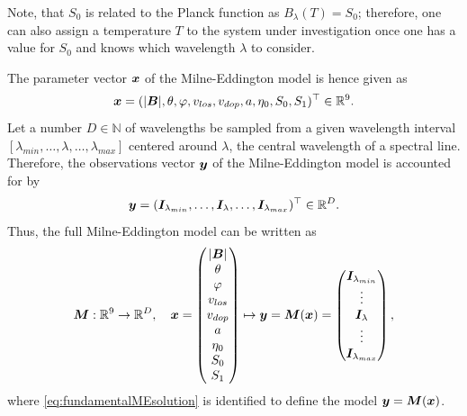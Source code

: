 \documentclass[a4paper,12pt]{report}
\begin{document}
Note, that $S_0$ is related to the Planck function as $B_\lambda(T) = S_0$; therefore, one can also assign a temperature $T$ to the system under investigation once one has a value for $S_0$ and knows which wavelength $\lambda$ to consider.

The parameter vector $\bm{x}$ of the Milne-Eddington model is hence given as \begin{equation}
\bm{x} = (|\bm{B}|,\theta,\varphi,v_{los},v_{dop},a,\eta_0,S_0,S_1)^\top \in \mathbb{R}^9.
\end{equation} 
Let a number $D \in \mathbb{N}$ of wavelengths be sampled from a given wavelength interval $[\lambda_{min},\dots,\lambda,\dots,\lambda_{max}]$ centered around $\lambda$, the central wavelength of a spectral line. Therefore, the observations vector $\bm{y}$ of the Milne-Eddington model is accounted for by \begin{equation}
\bm{y} = (\bm{I}_{\lambda_{min}},\dots,\bm{I}_\lambda,\dots,\bm{I}_{\lambda_{max}})^\top \in \mathbb{R}^D.
\end{equation} 
Thus, the full Milne-Eddington model can be written as \begin{equation}\label{eq:ME_model_equation}
\bm{M}:\mathbb{R}^9 \rightarrow \mathbb{R}^D, \quad \bm{x} = \begin{pmatrix}
|\bm{B}| \\
\theta \\
\varphi \\
v_{los} \\
v_{dop} \\
a \\
\eta_0 \\
S_0 \\
S_1
\end{pmatrix} \mapsto \bm{y} = \bm{M}(\bm{x}) = \begin{pmatrix}
\bm{I}_{\lambda_{min}} \\
\vdots \\
\bm{I}_{\lambda} \\
\vdots \\
\bm{I}_{\lambda_{max}}
\end{pmatrix},
\end{equation}
where \cref{eq:fundamentalMEsolution} is identified to define the model $\bm{y} = \bm{M}(\bm{x})$.
\end{document}
